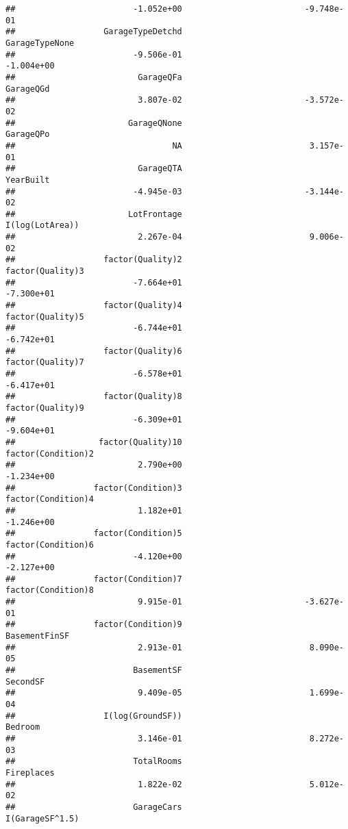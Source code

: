 \documentclass[
]{article}
\begin{document}
\begin{verbatim}
##                        -1.052e+00                         -9.748e-01  
##                  GarageTypeDetchd                     GarageTypeNone  
##                        -9.506e-01                         -1.004e+00  
##                         GarageQFa                          GarageQGd  
##                         3.807e-02                         -3.572e-02  
##                       GarageQNone                          GarageQPo  
##                                NA                          3.157e-01  
##                         GarageQTA                          YearBuilt  
##                        -4.945e-03                         -3.144e-02  
##                       LotFrontage                    I(log(LotArea))  
##                         2.267e-04                          9.006e-02  
##                  factor(Quality)2                   factor(Quality)3  
##                        -7.664e+01                         -7.300e+01  
##                  factor(Quality)4                   factor(Quality)5  
##                        -6.744e+01                         -6.742e+01  
##                  factor(Quality)6                   factor(Quality)7  
##                        -6.578e+01                         -6.417e+01  
##                  factor(Quality)8                   factor(Quality)9  
##                        -6.309e+01                         -9.604e+01  
##                 factor(Quality)10                 factor(Condition)2  
##                         2.790e+00                         -1.234e+00  
##                factor(Condition)3                 factor(Condition)4  
##                         1.182e+01                         -1.246e+00  
##                factor(Condition)5                 factor(Condition)6  
##                        -4.120e+00                         -2.127e+00  
##                factor(Condition)7                 factor(Condition)8  
##                         9.915e-01                         -3.627e-01  
##                factor(Condition)9                      BasementFinSF  
##                         2.913e-01                          8.090e-05  
##                        BasementSF                           SecondSF  
##                         9.409e-05                          1.699e-04  
##                  I(log(GroundSF))                            Bedroom  
##                         3.146e-01                          8.272e-03  
##                        TotalRooms                         Fireplaces  
##                         1.822e-02                          5.012e-02  
##                        GarageCars                    I(GarageSF^1.5)  

\end{verbatim}
\end{document}
